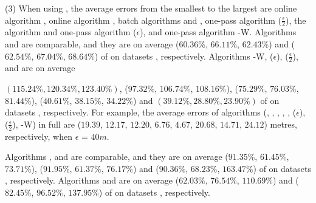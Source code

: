 \sstab (3) When using \sed, the average errors from the smallest
to the largest are online algorithm {\dagots}, online algorithm \squishe, batch algorithms \tpa and \dpa,
one-pass algorithm \cised($\frac{\epsilon}{2}$),  the \opt algorithm and one-pass algorithm \cised(${\epsilon}$), and one-pass algorithm {\cised-W}.
%
Algorithms \tpa and \dpa are comparable, and they are on average
{($60.36\%$, $66.11\%$, $62.43\%$) and ($62.54\%$, $67.04\%$, $68.64\%$)} of \opt on datasets \dSets, respectively.
Algorithms {\cised-W}, \cised(${\epsilon}$), \cised($\frac{\epsilon}{2}$), \squishe and {\dagots} are on average {{$(115.24\%, 120.34\%, 123.40\%)$}, ($97.32\%$, $106.74\%$, $108.16\%$), ($75.29\%$, $76.03\%$, $81.44\%$), ($40.61\%$, $38.15\%$, $34.22\%$) and {$(39.12\%, 28.80\%, 23.90\%)$} of \opt on datasets \dSets, respectively.
%
For example, the average errors of algorithms
(\opt, \tpa, \dpa, \squishe, {\dagots}, \cised(${\epsilon}$), \cised($\frac{\epsilon}{2}$),  {\cised-W}) in full \mopsi are ($19.39$, $12.17$, $12.20$,  $6.76$, {$4.67$}, $20.68$, $14.71$,  {$24.12$}) metres, respectively, when $\epsilon$ = $40m$.
%


Algorithms \tpa, \opwa and \interval are comparable, and they are on average
{($91.35\%$, $61.45\%$, $73.71\%$), ($91.95\%$, $61.37\%$, $76.17\%$) and ($90.36\%$, $68.23\%$, $163.47\%$)} of \opt on datasets \dSets, respectively.
Algorithms \intersec and \dpa are on average ($62.03\%$, $76.54\%$, $110.69\%$) and ($82.45\%$, $96.52\%$, $137.95\%$) of \opt on datasets \dSets, respectively.

}
